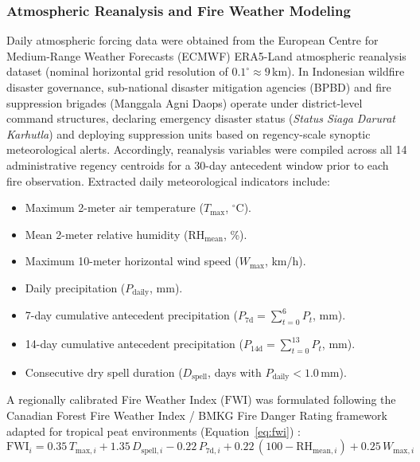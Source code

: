 \subsubsection{Atmospheric Reanalysis and Fire Weather Modeling}
\label{subsubsec:weather_era5}

Daily atmospheric forcing data were obtained from the European Centre for Medium-Range Weather Forecasts (ECMWF) ERA5-Land atmospheric reanalysis dataset (nominal horizontal grid resolution of $0.1^\circ \approx 9$\,km). In Indonesian wildfire disaster governance, sub-national disaster mitigation agencies (BPBD) and fire suppression brigades (Manggala Agni Daops) operate under district-level command structures, declaring emergency disaster status (\textit{Status Siaga Darurat Karhutla}) and deploying suppression units based on regency-scale synoptic meteorological alerts. Accordingly, reanalysis variables were compiled across all 14 administrative regency centroids for a 30-day antecedent window prior to each fire observation. Extracted daily meteorological indicators include:
\begin{itemize}
    \item Maximum 2-meter air temperature ($T_{\text{max}}$, $^\circ\text{C}$).
    \item Mean 2-meter relative humidity ($\text{RH}_{\text{mean}}$, \%).
    \item Maximum 10-meter horizontal wind speed ($W_{\text{max}}$, km/h).
    \item Daily precipitation ($P_{\text{daily}}$, mm).
    \item 7-day cumulative antecedent precipitation ($P_{\text{7d}} = \sum_{t=0}^{6} P_{t}$, mm).
    \item 14-day cumulative antecedent precipitation ($P_{\text{14d}} = \sum_{t=0}^{13} P_{t}$, mm).
    \item Consecutive dry spell duration ($D_{\text{spell}}$, days with $P_{\text{daily}} < 1.0$\,mm).
\end{itemize}

A regionally calibrated Fire Weather Index ($\text{FWI}$) was formulated following the Canadian Forest Fire Weather Index / BMKG Fire Danger Rating framework adapted for tropical peat environments (Equation~\eqref{eq:fwi}) \citep{Spessa2015Biogeosciences}:
\begin{equation}
\text{FWI}_i = 0.35\,T_{\text{max}, i} + 1.35\,D_{\text{spell}, i} - 0.22\,P_{\text{7d}, i} + 0.22\,(100 - \text{RH}_{\text{mean}, i}) + 0.25\,W_{\text{max}, i}
\label{eq:fwi}
\end{equation}

